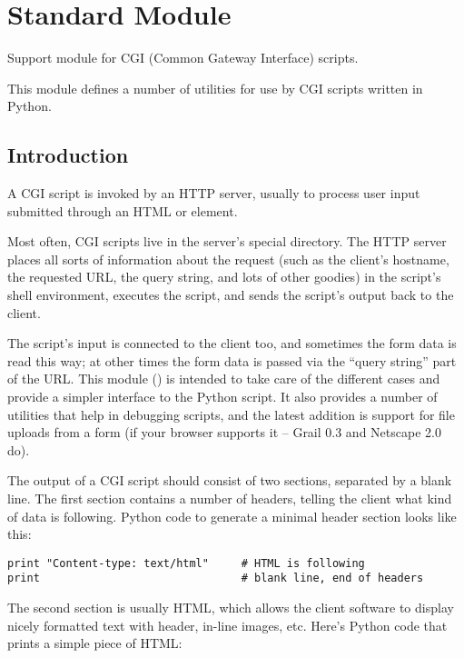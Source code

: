 \section{Standard Module }
\label{module-cgi}

\renewcommand{\indexsubitem}{(in module cgi)}

Support module for CGI (Common Gateway Interface) scripts.

This module defines a number of utilities for use by CGI scripts
written in Python.

\subsection{Introduction}

A CGI script is invoked by an HTTP server, usually to process user
input submitted through an HTML  or  element.

Most often, CGI scripts live in the server's special 
directory.  The HTTP server places all sorts of information about the
request (such as the client's hostname, the requested URL, the query
string, and lots of other goodies) in the script's shell environment,
executes the script, and sends the script's output back to the client.

The script's input is connected to the client too, and sometimes the
form data is read this way; at other times the form data is passed via
the ``query string'' part of the URL.  This module () is intended
to take care of the different cases and provide a simpler interface to
the Python script.  It also provides a number of utilities that help
in debugging scripts, and the latest addition is support for file
uploads from a form (if your browser supports it -- Grail 0.3 and
Netscape 2.0 do).

The output of a CGI script should consist of two sections, separated
by a blank line.  The first section contains a number of headers,
telling the client what kind of data is following.  Python code to
generate a minimal header section looks like this:

\bcode\begin{verbatim}
print "Content-type: text/html"     # HTML is following
print                               # blank line, end of headers
\end{verbatim}\ecode
%
The second section is usually HTML, which allows the client software
to display nicely formatted text with header, in-line images, etc.
Here's Python code that prints a simple piece of HTML:

